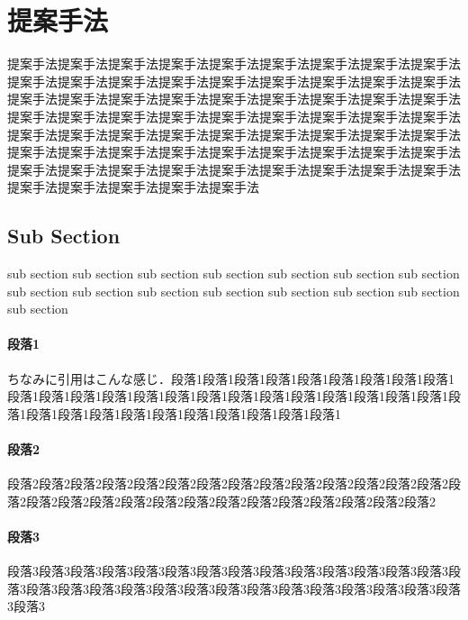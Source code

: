 

\section{提案手法} %
\label{sec:提案手法}

	提案手法提案手法提案手法提案手法提案手法提案手法提案手法提案手法提案手法提案手法提案手法提案手法提案手法提案手法提案手法提案手法提案手法提案手法提案手法提案手法提案手法提案手法提案手法提案手法提案手法提案手法提案手法提案手法提案手法提案手法提案手法提案手法提案手法提案手法提案手法提案手法提案手法提案手法提案手法提案手法提案手法提案手法提案手法提案手法提案手法提案手法提案手法提案手法提案手法提案手法提案手法提案手法提案手法提案手法提案手法提案手法提案手法提案手法提案手法提案手法提案手法提案手法提案手法提案手法提案手法提案手法提案手法提案手法

  \subsection{Sub Section} %
  \label{sub:sub_section}
  	sub section sub section sub section sub section sub section sub section sub section sub section sub section sub section sub section sub section sub section sub section sub section


    \paragraph{段落1} %
    \label{par:段落1}
      ちなみに引用はこんな感じ\cite{工作好きな情報系14:online}．段落1段落1段落1段落1段落1段落1段落1段落1段落1段落1段落1段落1段落1段落1段落1段落1段落1段落1段落1段落1段落1段落1段落1段落1段落1段落1段落1段落1段落1段落1段落1段落1段落1段落1


    \paragraph{段落2} %
    \label{par:段落2}
      段落2段落2段落2段落2段落2段落2段落2段落2段落2段落2段落2段落2段落2段落2段落2段落2段落2段落2段落2段落2段落2段落2段落2段落2段落2段落2段落2段落2


    \paragraph{段落3} %
    \label{par:段落3}
      段落3段落3段落3段落3段落3段落3段落3段落3段落3段落3段落3段落3段落3段落3段落3段落3段落3段落3段落3段落3段落3段落3段落3段落3段落3段落3段落3段落3段落3段落3

